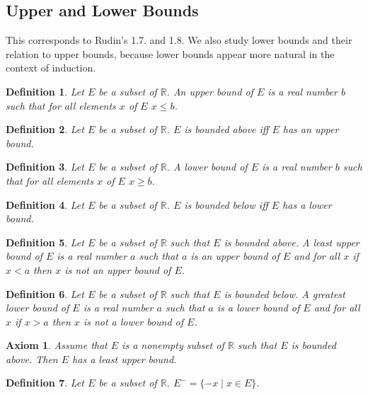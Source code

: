 \documentclass{article}
\newenvironment{forthel}{\begin{leftbar}}{\end{leftbar}}
\newtheorem{axiom}{Axiom}
\newtheorem{definition}{Definition}
\newcommand{\RR}{\mathbb{R}}
\begin{document}
\subsection{Upper and Lower Bounds}
This corresponds to Rudin's 1.7. and 1.8. We also study lower bounds and their relation to upper bounds, because lower bounds appear more natural in the context of induction.
\begin{forthel}
\begin{definition} Let $E$ be a subset of $\RR$. 
An \emph{upper bound} of $E$ is a
real number $b$ such that for all elements $x$ of $E$ $x \leq b$.
\end{definition}

\begin{definition} Let $E$ be a subset of $\RR$. $E$ is 
\emph{bounded above} iff
$E$ has an upper bound.\end{definition}

\begin{definition} Let $E$ be a subset of $\RR$. 
A \emph{lower bound} of $E$ is a
real number $b$ such that for all elements $x$ of $E$ $x \geq b$.
\end{definition}

\begin{definition} Let $E$ be a subset of $\RR$. 
$E$ is \emph{bounded below} iff
$E$ has a lower bound.\end{definition}

\begin{definition} Let $E$ be a subset of $\RR$ such that $E$ is bounded above.
A \emph{least upper bound} of $E$ is a real number $a$ such that
$a$ is an upper bound of $E$ and for all $x$ if $x < a$ then $x$ 
is not an upper bound of $E$.\end{definition}

\begin{definition} Let $E$ be a subset of $\RR$ such that $E$ 
is bounded below.
A \emph{greatest lower bound} of $E$ is a real number $a$ such that
$a$ is a lower bound of $E$ and for all $x$ if $x > a$ then $x$ is 
not a lower bound of $E$.\end{definition}

\begin{axiom} Assume that $E$ is a nonempty subset of $\RR$ 
such that $E$ is bounded
above. Then $E$ has a least upper bound.
\end{axiom}

\begin{definition} Let $E$ be a subset of $\RR$. 
$E^- = \{-x \mid x \in E\}$.\end{definition}


\end{forthel}
\end{document}

